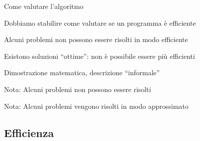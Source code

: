 \begin{frame}{Come valutare l'algoritmo}

\vspace{-9pt}
\begin{myboxtitle}
\BIL
\item Dobbiamo stabilire come valutare se un programma è efficiente
\item Alcuni problemi non possono essere risolti in modo efficiente
\item Esistono soluzioni “ottime”: non è possibile essere più efficienti
\EIL
\end{myboxtitle}

\begin{myboxtitle}
\BIL
\item  Dimostrazione matematica, descrizione “informale”
\item Nota: Alcuni problemi non possono essere risolti
\item Nota: Alcuni problemi vengono risolti in modo approssimato
\EIL
\end{myboxtitle}

\end{frame}

\subsection{Efficienza}

